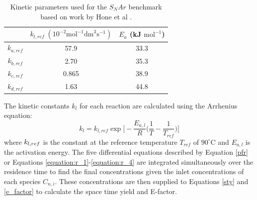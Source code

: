 \begin{table}[tb]
  \centering
  \caption{Kinetic parameters used for the $S_NAr$ benchmark based on work by Hone et al \cite{Hone2017}.}
  \begin{tabular}{ccc}
    &$k_{l,ref} \; (10^{-2} \text{mol}^{-1} \text{dm}^3 \text{s}^{-1})$ & $E_a$ (kJ $\text{mol}^{-1}$) \\
    \hline
    $k_{a,ref}$ & 57.9 & 33.3  \\
    $k_{b,ref}$ & 2.70 & 35.3  \\
    $k_{c,ref}$ & 0.865 & 38.9 \\
    $k_{d,ref}$ & 1.63 & 44.8 \\
  \end{tabular}
  
  \label{table:snar_parameters}
\end{table}

The kinetic constants $k_l$ for each reaction are calculated using the Arrhenius equation:
\begin{equation}
	k_l = k_{l, ref} \exp\Biggl[-\frac{E_{a,l}}{R}\biggl(\frac{1}{T}-\frac{1}{T_{ref}}\biggr)\Biggr]
\end{equation}
where $k_{l, \\ref}$ is the constant at the reference temperature $T_{ref}$ of $90^{\circ}$C and $E_{a,l}$ is the activation energy. The five differential equations described by Equation \ref{pfr} or Equations \ref{equation:r_1}-\ref{equation:r_4} are integrated simultaneously over the residence time to find the final concentrations given the inlet concentrations of each species $C_{n,i}$. These concentrations are then supplied to Equations \ref{sty} and \ref{e_factor} to calculate the space time yield and E-factor.



